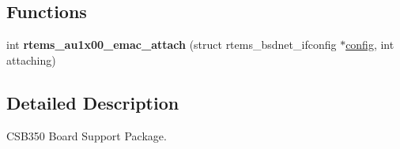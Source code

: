 \subsection*{Functions}
\begin{DoxyCompactItemize}
\item 
\mbox{\label{group__RTEMSBSPsMIPSCSB350_ga73250754370fa1a50024748a1fc670be}} 
int {\bfseries rtems\+\_\+au1x00\+\_\+emac\+\_\+attach} (struct rtems\+\_\+bsdnet\+\_\+ifconfig $\ast$\mbox{\hyperlink{structconfig__s}{config}}, int attaching)
\end{DoxyCompactItemize}


\subsection{Detailed Description}
C\+S\+B350 Board Support Package. 

